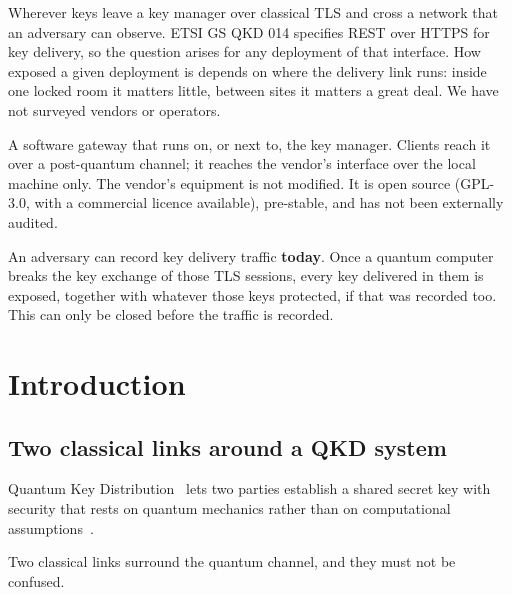\documentclass[11pt,letterpaper]{article}
\begin{document}
\begin{tcolorbox}[colback=blue!5!white, colframe=blue!60!black, title=\textbf{Where it applies}]
Wherever keys leave a key manager over classical TLS and cross a network that an adversary can observe. ETSI GS QKD 014 specifies REST over HTTPS for key delivery, so the question arises for any deployment of that interface. How exposed a given deployment is depends on where the delivery link runs: inside one locked room it matters little, between sites it matters a great deal. We have not surveyed vendors or operators.
\end{tcolorbox}

\begin{tcolorbox}[colback=green!5!white, colframe=green!60!black, title=\textbf{What PQTG is}]
A software gateway that runs on, or next to, the key manager. Clients reach it over a post-quantum channel; it reaches the vendor's interface over the local machine only. The vendor's equipment is not modified. It is open source (GPL-3.0, with a commercial licence available), pre-stable, and has not been externally audited.
\end{tcolorbox}

\begin{tcolorbox}[colback=yellow!5!white, colframe=orange!60!black, title=\textbf{Why timing matters}]
An adversary can record key delivery traffic \textbf{today}. Once a quantum computer breaks the key exchange of those TLS sessions, every key delivered in them is exposed, together with whatever those keys protected, if that was recorded too. This can only be closed before the traffic is recorded.
\end{tcolorbox}

\newpage

\section{Introduction}

\subsection{Two classical links around a QKD system}

Quantum Key Distribution~\cite{bennett1984quantum,ekert1991quantum} lets two parties establish a shared secret key with security that rests on quantum mechanics rather than on computational assumptions~\cite{gisin2002quantum,shor2000simple}.

Two classical links surround the quantum channel, and they must not be confused.
\end{document}
